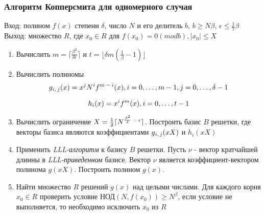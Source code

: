   \subsubsection{Алгоритм Копперсмита для одномерного случая}
    Вход: полином {$f(x)$} степени {$\delta$}, число {$N$} и его делитель {$b$}, {$b \ge N\beta$}, {$\epsilon \le \frac{1}{7} \beta$} \\
    Выход: множество {$R$}, где {$x_0 \in R$} для {$f(x_0) = 0 (mod b), |x_0| \le X$}
    
    \begin{enumerate}
      \item Вычислить {$m = \lceil \frac{\beta^2}{\delta \epsilon} \rceil$} и {$t = \lfloor \delta m (\frac{1}{\beta} - 1) \rfloor$}
      \item Вычислить полиномы
	\begin{equation}
	  \textit{{$ g\textsubscript{{$i,j$}}(x) = x^j N^i f\textsuperscript{{$m-i$}}(x), i=0, \dots, m-1, j=0, \dots, \delta-1 $}}
	\end{equation}
	
	\begin{equation}
	  \textit{{$ h_i(x) = x^i f^m(x), i = 0, \dots, t-1 $}}
	\end{equation}
	
      \item Вычислить ограничение {$X = \frac{1}{2} \lceil N\textsuperscript{{$\frac{\beta^2}{\delta} - \epsilon$}} \rceil$}. Построить базис {$B$} решетки,
	где векторы базиса являются коэффициентами {$g\textsubscript{{$i,j$}}(x X)$} и {$h_i(x X)$}
      \item Применить \textit{LLL-алгоритм} к базису {$B$} решетки. Пусть {$\nu$} - вектор кратчайшей длинны в \textit{LLL-приведенном} базисе. Вектор {$\nu$}
	является коэффициент-вектором полинома {$g(xX)$}. Построить полином {$g(x)$}.
      \item Найти множество {$R$} решений {$g(x)$} над целыми числами. Для каждого корня {$x_0 \in R$} проверить условие НОД{$(N, f(x_0)) \ge N^\beta$}, 
	если условие не выполняется, то необходимо исключить {$x_0$} из {$R$}
    \end{enumerate}

    